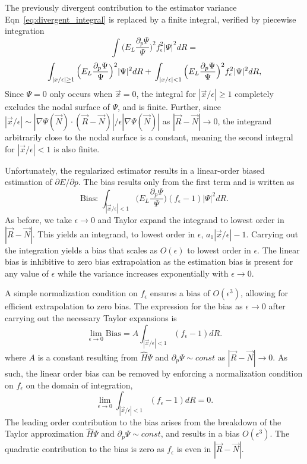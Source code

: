 \documentclass[twocolumn]{revtex4-1}
\begin{document}
The previously divergent contribution to the estimator variance Eqn~\ref{eq:divergent_integral} is replaced by a finite integral, verified by piecewise integration
$$
\int \Big(E_L\frac{\partial_p\Psi}{\Psi}\Big)^2 f_\epsilon^2 |\Psi|^2 dR = $$
$$ \int_{|x/\epsilon|\geq 1} \Big(E_L\frac{\partial_p\Psi}{\Psi}\Big)^2 |\Psi|^2 dR +\\ \int_{|x/\epsilon|< 1} \Big(E_L\frac{\partial_p\Psi}{\Psi}\Big)^2 f_\epsilon^2 |\Psi|^2 dR,
$$
Since $\Psi = 0$ only occurs when $\vec{x} = 0$, the integral for $|\vec{x}/\epsilon|\geq 1$ completely excludes the nodal surface of $\Psi$, and is finite. 
Further, since $|\vec{x}/\epsilon| \sim |\nabla\Psi(\vec{N}) \cdot (\vec{R}-\vec{N})|/\epsilon|\nabla  \Psi(\vec{N})|$ as $|\vec{R} - \vec{N}| \rightarrow 0$, the integrand arbitrarily close to the nodal surface is a constant, meaning the second integral for $|\vec{x}/\epsilon| < 1$ is also finite.

Unfortunately, the regularized estimator results in a linear-order biased estimation of $\partial E/\partial p$.
The bias results only from the first term and is written as 
$$
\text{Bias: } \int_{|\vec{x}/\epsilon|< 1} \Big(E_L\frac{\partial_p\Psi}{\Psi}\Big) (f_\epsilon - 1)|\Psi|^2 dR.
$$
As before, we take $\epsilon \rightarrow 0$ and Taylor expand the integrand to lowest order in $|\vec{R}-\vec{N}|$.
This yields an integrand, to lowest order in $\epsilon$, $a_1|\vec{x}/\epsilon| - 1$.
Carrying out the integration yields a bias that scales as $O(\epsilon)$ to lowest order in $\epsilon$.
The linear bias is inhibitive to zero bias extrapolation as the estimation bias is present for any value of $\epsilon$ while the variance increases exponentially with $\epsilon \rightarrow 0$.

A simple normalization condition on $f_\epsilon$ ensures a bias of $O(\epsilon^3)$, allowing for efficient extrapolation to zero bias.
The expression for the bias as $\epsilon \rightarrow 0$ after carrying out the necessary Taylor expansions is
$$
\lim_{\epsilon\rightarrow 0}\text{Bias} =  A \int_{|\vec{x}/\epsilon|< 1} (f_\epsilon - 1) dR.
$$
where $A$ is a constant resulting from $\hat{H}\Psi$ and $\partial_p \Psi \sim const$ as $|\vec{R}-\vec{N}|\rightarrow 0$.
As such, the linear order bias can be removed by enforcing a normalization condition on $f_\epsilon$ on the domain of integration, 
$$
\lim_{\epsilon\rightarrow 0} \int_{|\vec{x}/\epsilon|< 1} (f_\epsilon - 1) dR = 0.
$$
The leading order contribution to the bias arises from the breakdown of the Taylor approximation $\hat{H}\Psi$ and $\partial_p \Psi \sim const$, and results in a bias $O(\epsilon^3)$.
The quadratic contribution to the bias is zero as $f_\epsilon$ is even in $|\vec{R}-\vec{N}|$.
\end{document}
